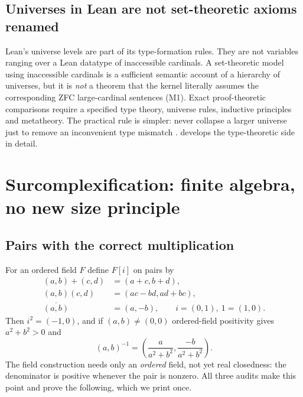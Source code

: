 \documentclass[11pt,letterpaper]{article}
\numberwithin{equation}{section}
\theoremstyle{definition}
\theoremstyle{remark}
\begin{document}
\subsection{Universes in Lean are not set-theoretic axioms renamed}
\label{found:sub:leanuniverses}
Lean's universe levels are part of its type-formation rules. They are not
variables ranging over a Lean datatype of inaccessible cardinals. A
set-theoretic model using inaccessible cardinals is a sufficient semantic
account of a hierarchy of universes, but it is \emph{not} a theorem that the
kernel literally assumes the corresponding ZFC large-cardinal sentences (M1).
Exact proof-theoretic comparisons require a specified type theory, universe
rules, inductive principles and metatheory. The practical rule is simpler: never
collapse a larger universe just to remove an inconvenient type mismatch
\cite{found:LeanUniverses}.  develops the type-theoretic
side in detail.

\section{Surcomplexification: finite algebra, no new size principle}
\label{found:sec:complex}

\subsection{Pairs with the correct multiplication}
\label{found:sub:pairs}
For an ordered field $F$ define $F[i]$ on pairs by
\begin{align}
 (a,b)+(c,d)&=(a+c,b+d),\label{found:eq:pairadd}\\
 (a,b)(c,d)&=(ac-bd,ad+bc),\label{found:eq:pairmul}\\
 \overline{(a,b)}&=(a,-b),\qquad i=(0,1),\ 1=(1,0).\label{found:eq:conj}
\end{align}
Then $i^2=(-1,0)$, and if $(a,b)\ne(0,0)$ ordered-field positivity gives
$a^2+b^2>0$ and
\begin{equation}\label{found:eq:pairinv}
 (a,b)^{-1}=\left(\frac{a}{a^2+b^2},\frac{-b}{a^2+b^2}\right).
\end{equation}
The field construction needs only an \emph{ordered} field, not yet real
closedness: the denominator is positive whenever the pair is nonzero. All three
audits make this point and prove the following, which we print once.
\end{document}
